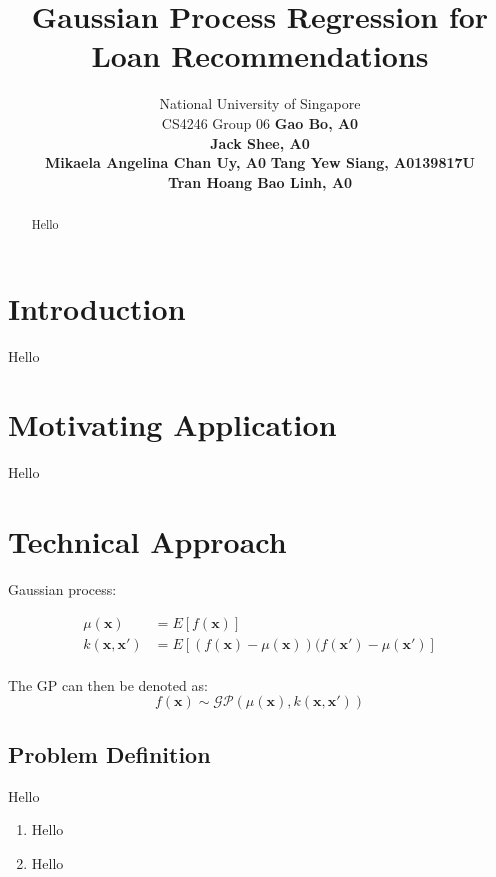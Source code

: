 \documentclass[letterpaper]{article}
\begin{document}
%
\title{Gaussian Process Regression for Loan Recommendations}
\author{
National University of Singapore \\
CS4246 Group 06 \AND
\normalsize\normalfont\textbf{Gao Bo, A0} \\ 
\normalsize\normalfont\textbf{Jack Shee, A0} \\
\normalsize\normalfont\textbf{Mikaela Angelina Chan Uy, A0} \And
\normalsize\normalfont\textbf{Tang Yew Siang, A0139817U} \\
\normalsize\normalfont\textbf{Tran Hoang Bao Linh, A0} 
}

\maketitle
\begin{abstract}
Hello
\end{abstract}

\section{Introduction}
\noindent Hello

\section{Motivating Application}
Hello

\section{Technical Approach}
Gaussian process:

\begin{align*}
	\mu(\textbf{x}) &= E[f(\textbf{x})] \\
	k(\textbf{x}, \textbf{x}') &= E[(f(\textbf{x}) - \mu(\textbf{x}))(f(\textbf{x}') - \mu(\textbf{x}')] \\
\end{align*}

The GP can then be denoted as:
\[f(\textbf{x}) \sim \mathcal{GP}(\mu(\textbf{x}), k(\textbf{x}, \textbf{x}'))\]

\subsection{Problem Definition}
Hello

\begin{enumerate}
	\item Hello
	\item Hello
\end{enumerate}
\end{document}

